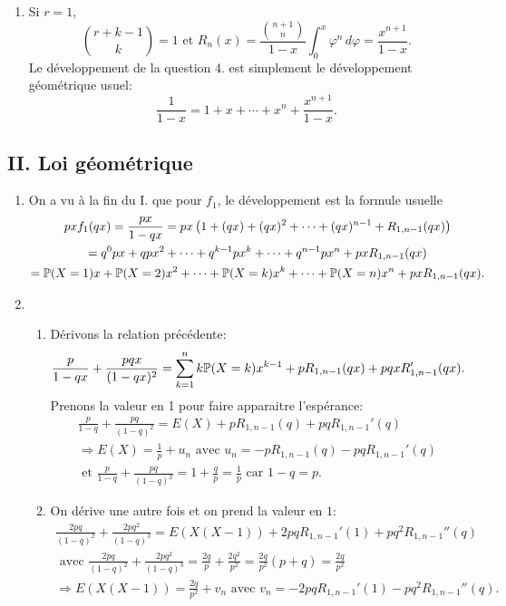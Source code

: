 \begin{enumerate}
\begin{enumerate}
    \item Si $r=1$, 
\[
  \binom{r+k-1}{k} = 1 \text{ et } R_n(x) = \frac{\binom{n+1}{n}}{1-x}\int_0^x \varphi^n\, d\varphi = \frac{x^{n+1}}{1-x}.
\]
    Le développement de la question 4. est simplement le développement géométrique usuel:
\[
  \frac{1}{1-x} = 1 + x + \cdots + x^n + \frac{x^{n+1}}{1-x}.
\]

  \end{enumerate}
\end{enumerate}

\subsection*{II. Loi géométrique}
\begin{enumerate}
  \item On a vu à la fin du I. que pour $f_1$, le développement est la formule usuelle
\begin{multline*}
  pxf_1(qx) = \frac{px}{1-qx} = px\left(1+(qx)+ (qx)^2 + \cdots + (qx)^{n-1} + R_{1,n-1}(qx)\right)\\
  = q^0px + qpx^2 + \cdots + q^{k-1}px^k + \cdots + q^{n-1}px^n + pxR_{1,n-1}(qx)\\
  = \mathbb{P}(X=1)x + \mathbb{P}(X=2)x^2 + \cdots + \mathbb{P}(X=k)x^k + \cdots + \mathbb{P}(X=n)x^n + pxR_{1,n-1}(qx).
\end{multline*}

  \item
  \begin{enumerate}
    \item Dérivons la relation précédente:
\[
  \frac{p}{1-qx} + \frac{pqx}{(1-qx)^2} = \sum_{k=1}^n k\mathbb{P}(X=k)x^{k-1} + pR_{1,n-1}(qx) + pqxR_{1,n-1}'(qx).
\]
Prenons la valeur en 1 pour faire apparaitre l'espérance:
\begin{multline*}
  \frac{p}{1-q} + \frac{pq}{(1-q)^2} = E(X) + pR_{1,n-1}(q) + pqR_{1,n-1}'(q)\\
  \Rightarrow E(X) = \frac{1}{p} + u_n \text{ avec } u_n = -pR_{1,n-1}(q) - pqR_{1,n-1}'(q)\\
  \text{ et } \frac{p}{1-q} + \frac{pq}{(1-q)^2} = 1 + \frac{q}{p} = \frac{1}{p} \text{ car } 1- q = p.
\end{multline*}

    \item On dérive une autre fois et on prend la valeur en $1$:
\begin{multline*}
  \frac{2pq}{(1-q)^2} + \frac{2pq^2}{(1-q)^3} = E(X(X-1)) +2pqR_{1, n-1}'(1) + pq^2R_{1,n-1}''(q)\\
\text{ avec }
  \frac{2pq}{(1-q)^2} + \frac{2pq^2}{(1-q)^3} = \frac{2q}{p} + \frac{2q^2}{p^2}= \frac{2q}{p^2}(p+q) = \frac{2q}{p^2}\\
  \Rightarrow E(X(X-1)) =   \frac{2q}{p^2} + v_n \text{ avec } v_n =-2pqR_{1, n-1}'(1) - pq^2R_{1,n-1}''(q).
\end{multline*}
    

\end{enumerate}
\end{enumerate}
